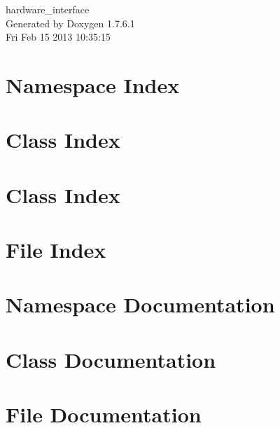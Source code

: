 \documentclass[a4paper]{book}
\begin{document}
\begin{titlepage}
\vspace*{7cm}
\begin{center}
{\Large hardware\-\_\-interface }\\
\vspace*{1cm}
{\large \-Generated by Doxygen 1.7.6.1}\\
\vspace*{0.5cm}
{\small Fri Feb 15 2013 10:35:15}\\
\end{center}
\end{titlepage}
\clearemptydoublepage
{}
\tableofcontents
\clearemptydoublepage
{}
\chapter{\-Namespace \-Index}

\chapter{\-Class \-Index}

\chapter{\-Class \-Index}

\chapter{\-File \-Index}

\chapter{\-Namespace \-Documentation}

\chapter{\-Class \-Documentation}











\chapter{\-File \-Documentation}





\printindex
\end{document}
